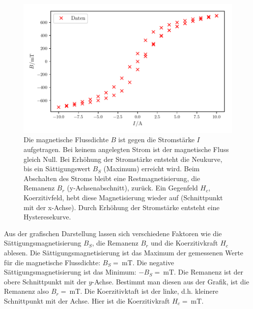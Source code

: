 \begin{figure}
    \centering
    \includegraphics{build/plotc.pdf}
    \caption{Die magnetische Flussdichte $B$ ist gegen die Stromstärke $I$
    aufgetragen. Bei keinem angelegten Strom ist der magnetische Fluss
    gleich Null. Bei Erhöhung der Stromstärke entsteht die Neukurve, bis
    ein Sättigungswert $B_{S}$ (Maximum) erreicht wird. Beim Abschalten des Stroms
    bleibt eine Restmagnetisierung, die Remanenz $B_{r}$ (y-Achsenabschnitt),
    zurück. Ein Gegenfeld $H_{c}$, Koerzitivfeld, hebt diese Magnetisierung wieder
    auf (Schnittpunkt mit der x-Achse). Durch Erhöhung der Stromstärke entsteht
    eine Hysteresekurve.}
    \label{plotc}
\end{figure}

\noindent Aus der grafischen Darstellung lassen sich verschiedene Faktoren
wie die Sättigungsmagnetisierung $B_{S}$, die Remanenz $B_{r}$ und die
Koerzitivkraft $H_{c}$ ablesen.
Die Sättigungsmagnetisierung ist das Maximum der gemessenen Werte für
die magnetische Flussdichte: $B_{S} = \SI{}{\milli\tesla}$. %
Die negative Sättigungsmagnetisierung ist das Minimum:
$-B_{S} = \SI{}{\milli\tesla}$. %
Die Remanenz ist der obere Schnittpunkt mit der $y$-Achse.
Bestimmt man diesen aus der Grafik, ist die Remanenz also
$B_{r} = \SI{}{\milli\tesla}$. %
Die Koerzitivktaft ist der linke, d.h. kleinere Schnittpunkt mit der Achse.
Hier ist die Koerzitivkraft $H_{c} = \SI{}{\milli\tesla}$. %